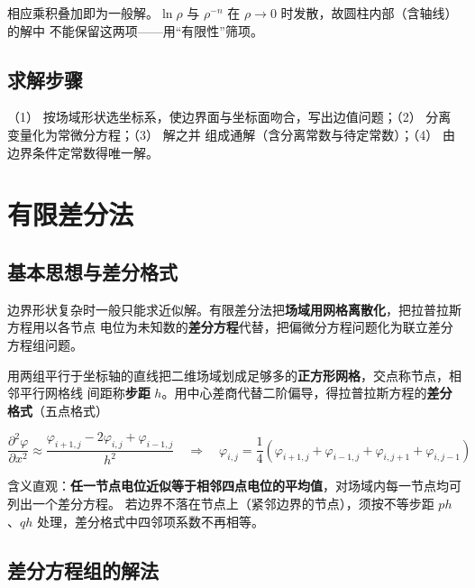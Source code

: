 相应乘积叠加即为一般解。$\ln\rho$ 与 $\rho^{-n}$ 在 $\rho\to0$ 时发散，故圆柱内部（含轴线）的解中
不能保留这两项——用“有限性”筛项。

\subsection{求解步骤}

（1） 按场域形状选坐标系，使边界面与坐标面吻合，写出边值问题；（2） 分离变量化为常微分方程；（3） 解之并
组成通解（含分离常数与待定常数）；（4） 由边界条件定常数得唯一解。


\section{有限差分法}

\subsection{基本思想与差分格式}

边界形状复杂时一般只能求近似解。有限差分法把\textbf{场域用网格离散化}，把拉普拉斯方程用以各节点
电位为未知数的\textbf{差分方程}代替，把偏微分方程问题化为联立差分方程组问题。

用两组平行于坐标轴的直线把二维场域划成足够多的\textbf{正方形网格}，交点称节点，相邻平行网格线
间距称\textbf{步距} $h$。用中心差商代替二阶偏导，得拉普拉斯方程的\textbf{差分格式}（五点格式）
\begin{formulaBox}
\[
\frac{\partial^2\varphi}{\partial x^2}\approx\frac{\varphi_{i+1,j}-2\varphi_{i,j}+\varphi_{i-1,j}}{h^2}
\quad\Longrightarrow\quad
\varphi_{i,j}=\frac{1}{4}\left(\varphi_{i+1,j}+\varphi_{i-1,j}+\varphi_{i,j+1}+\varphi_{i,j-1}\right)
\]
\end{formulaBox}

含义直观：\textbf{任一节点电位近似等于相邻四点电位的平均值}，对场域内每一节点均可列出一个差分方程。
若边界不落在节点上（紧邻边界的节点），须按不等步距 $ph$、$qh$ 处理，差分格式中四邻项系数不再相等。

\subsection{差分方程组的解法}

